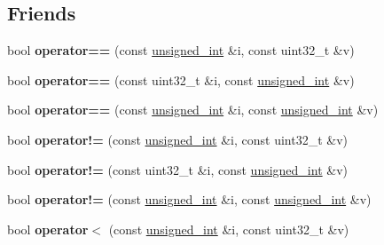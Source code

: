 \subsection*{Friends}
\begin{DoxyCompactItemize}
\item 
\mbox{\label{structunsigned__int_a08687d9bd50d9dec64808a19580f2a47}} 
bool {\bfseries operator==} (const \mbox{\hyperlink{structunsigned__int}{unsigned\+\_\+int}} \&i, const uint32\+\_\+t \&v)
\item 
\mbox{\label{structunsigned__int_a8c6aae02c0e6500d98d56544b4c49da0}} 
bool {\bfseries operator==} (const uint32\+\_\+t \&i, const \mbox{\hyperlink{structunsigned__int}{unsigned\+\_\+int}} \&v)
\item 
\mbox{\label{structunsigned__int_add87b4023be256deec5ac1afe4faf17c}} 
bool {\bfseries operator==} (const \mbox{\hyperlink{structunsigned__int}{unsigned\+\_\+int}} \&i, const \mbox{\hyperlink{structunsigned__int}{unsigned\+\_\+int}} \&v)
\item 
\mbox{\label{structunsigned__int_a53410718318d48dd4e6279103b351663}} 
bool {\bfseries operator!=} (const \mbox{\hyperlink{structunsigned__int}{unsigned\+\_\+int}} \&i, const uint32\+\_\+t \&v)
\item 
\mbox{\label{structunsigned__int_a1f618b0b2975a066c658435fb7eca0f9}} 
bool {\bfseries operator!=} (const uint32\+\_\+t \&i, const \mbox{\hyperlink{structunsigned__int}{unsigned\+\_\+int}} \&v)
\item 
\mbox{\label{structunsigned__int_a897385977d9c06e539a1c19dbdffb5ec}} 
bool {\bfseries operator!=} (const \mbox{\hyperlink{structunsigned__int}{unsigned\+\_\+int}} \&i, const \mbox{\hyperlink{structunsigned__int}{unsigned\+\_\+int}} \&v)
\item 
\mbox{\label{structunsigned__int_a1ff316df3fa8ffdc0886d48e4d50e7f2}} 
bool {\bfseries operator$<$} (const \mbox{\hyperlink{structunsigned__int}{unsigned\+\_\+int}} \&i, const uint32\+\_\+t \&v)
\item 
\mbox{\label{structunsigned__int_a9672c0a7766d6491003103052ddc692b}} 

\end{DoxyCompactItemize}
